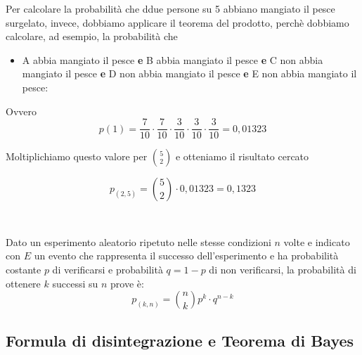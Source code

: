 \documentclass{article}     %
\begin{document}
\begin{ex}
                Per calcolare la probabilità che ddue persone su 5 abbiano mangiato il pesce surgelato, invece, dobbiamo applicare il teorema del prodotto, perchè dobbiamo calcolare, ad esempio, la probabilità che 
                \begin{itemize}
                    \item A abbia mangiato il pesce \textbf{e} B abbia mangiato il pesce \textbf{e} C non abbia mangiato il pesce \textbf{e} D non abbia mangiato il pesce \textbf{e} E non abbia mangiato il pesce:
                \end{itemize}
                Ovvero 
                \[p(1)=\frac{7}{10}\cdot\frac{7}{10}\cdot\frac{3}{10}\cdot\frac{3}{10}\cdot\frac{3}{10}=0,01323\]

                Moltiplichiamo questo valore per $\binom{5}{2}$ e otteniamo il risultato cercato

                \[p_{(2,5)}=\binom{5}{2}\cdot 0,01323=0,1323\]
                \end{ex}
                ~
                \begin{shadedTheorem}
                    Dato un esperimento aleatorio ripetuto nelle stesse condizioni $n$ volte e indicato con $E$ un evento che rappresenta il successo dell'esperimento e ha probabilità costante $p$ di verificarsi e probabilità $q=1-p$ di non verificarsi, la probabilità di ottenere $k$ successi su $n$ prove è: \[p_{(k,n)}=\binom{n}{k}p^k\cdot q^{n-k}\]
                \end{shadedTheorem}
            \subsection{Formula di disintegrazione e Teorema di Bayes}
\end{document}
